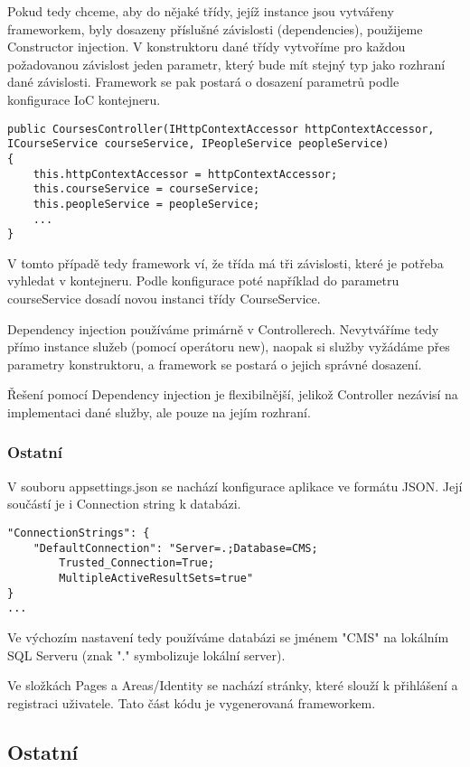 Pokud tedy chceme, aby do nějaké třídy, jejíž instance jsou vytvářeny frameworkem, byly dosazeny příslušné závislosti (dependencies), použijeme Constructor injection. V konstruktoru dané třídy vytvoříme pro každou požadovanou závislost jeden parametr, který bude mít stejný typ jako rozhraní dané závislosti. Framework se pak postará o dosazení parametrů podle konfigurace IoC kontejneru.

\begin{lstlisting}
public CoursesController(IHttpContextAccessor httpContextAccessor, ICourseService courseService, IPeopleService peopleService)
{
	this.httpContextAccessor = httpContextAccessor;
	this.courseService = courseService;
	this.peopleService = peopleService;
	...
}
\end{lstlisting}
V tomto případě tedy framework ví, že třída má tři závislosti, které je potřeba vyhledat v kontejneru.
Podle konfigurace poté například do parametru courseService dosadí novou instanci třídy CourseService. 

Dependency injection používáme primárně v Controllerech.
Nevytváříme tedy přímo instance služeb (pomocí operátoru new), naopak si služby vyžádáme přes parametry konstruktoru, a framework se postará o jejich správné dosazení.

Řešení pomocí Dependency injection je flexibilnější, jelikož Controller nezávisí na implementaci dané služby, ale pouze na jejím rozhraní.

\subsubsection*{Ostatní}

V souboru appsettings.json se nachází konfigurace aplikace ve formátu JSON. Její součástí je i Connection string k databázi. 
\begin{lstlisting}
"ConnectionStrings": {
	"DefaultConnection": "Server=.;Database=CMS;
		Trusted_Connection=True;
		MultipleActiveResultSets=true" 
}
...
\end{lstlisting}

Ve výchozím nastavení tedy používáme databázi se jménem "CMS" na lokálním SQL Serveru (znak "." symbolizuje lokální server).

Ve složkách Pages a Areas/Identity se nachází stránky, které slouží k přihlášení a registraci uživatele. Tato část kódu je vygenerovaná frameworkem.

\newpage

\subsection{Ostatní}

